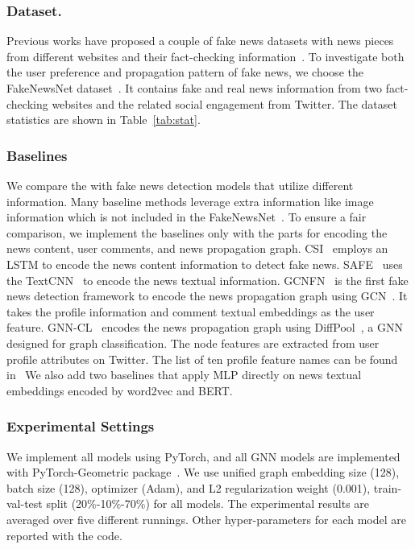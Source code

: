 \documentclass[sigconf]{acmart}
\newcommand\UPFD{\xspace}
\begin{document}
\subsubsection{Dataset.}
Previous works have proposed a couple of fake news datasets with news pieces from different websites and their fact-checking information~\cite{wang2017liar, potthast_martin_2018_1239675}. 
To investigate both the user preference and propagation pattern of fake news, we choose the FakeNewsNet dataset~\cite{shu2018fakenewsnet}.
It contains fake and real news information from two fact-checking websites and the related social engagement from Twitter.
The dataset statistics are shown in Table~\ref{tab:stat}.



\subsubsection{Baselines}

We compare the \UPFD with fake news detection models that utilize different information.
Many baseline methods leverage extra information like image information which is not included in the FakeNewsNet~\cite{shu2018fakenewsnet}.
To ensure a fair comparison, we implement the baselines only with the parts for encoding the news content, user comments, and news propagation graph. 
CSI~\cite{ruchansky2017csi} employs an LSTM to encode the news content information to detect fake news.
SAFE~\cite{zhou2020mathsf} uses the TextCNN~\cite{zhang2015sensitivity} to encode the news textual information.
GCNFN~\cite{monti2019fake} is the first fake news detection framework to encode the news propagation graph using GCN~\cite{kipf2016semi}.
It takes the profile information and comment textual embeddings as the user feature.
GNN-CL~\cite{han2020graph} encodes the news propagation graph using DiffPool~\cite{ying2018hierarchical}, a GNN designed for graph classification.
The node features are extracted from user profile attributes on Twitter.
The list of ten profile feature names can be found in~\cite{han2020graph, lu2020gcan}
We also add two baselines that apply MLP directly on news textual embeddings encoded by word2vec and BERT.



\subsubsection{Experimental Settings}
\label{sec:exp_settings}
We implement all models using PyTorch, and all GNN models are implemented with PyTorch-Geometric package~\cite{Fey2019fast}.
We use unified graph embedding size (128), batch size (128), optimizer (Adam), and L2 regularization weight (0.001), train-val-test split (20\%-10\%-70\%) for all models.
The experimental results are averaged over five different runnings. 
Other hyper-parameters for each model are reported with the code.
\end{document}
